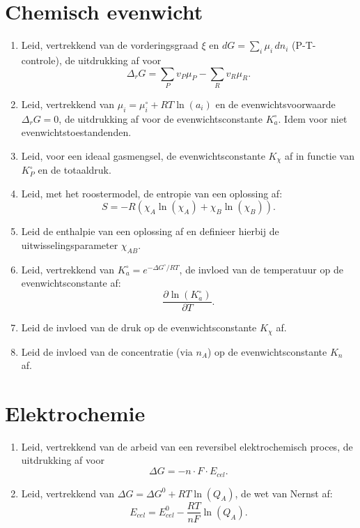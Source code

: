 \documentclass[11pt]{article}
\begin{document}
\section*{Chemisch evenwicht}

\begin{enumerate}[label=\textbf{\arabic*.}, leftmargin=1.5cm, resume]

\item Leid, vertrekkend van de vorderingsgraad $\xi$ en $dG = \sum_i \mu_i\,dn_i$ (P-T-controle), de uitdrukking af voor
\[
\Delta_r G = \sum_P v_P\mu_P - \sum_R v_R\mu_R.
\]

\item Leid, vertrekkend van $\mu_i = \mu_i^\circ + RT\ln(a_i)$ en de evenwichtsvoorwaarde $\Delta_r G = 0$,
de uitdrukking af voor de evenwichtsconstante $K_a^\circ$. Idem voor niet evenwichtstoestandenden.

\item Leid, voor een ideaal gasmengsel, de evenwichtsconstante $K_\chi$ af in functie van $K_P^\circ$ en de totaaldruk.

\item Leid, met het roostermodel, de entropie van een oplossing af:
\[
S = -R\left(\chi_A\ln(\chi_A) + \chi_B\ln(\chi_B)\right).
\]

\item Leid de enthalpie van een oplossing af en definieer hierbij de uitwisselingsparameter $\chi_{AB}$.

\item Leid, vertrekkend van $K_a^\circ = e^{-\Delta G^\circ/RT}$, de invloed van de temperatuur op de evenwichtsconstante af:
\[
\frac{\partial \ln(K_a^\circ)}{\partial T}.
\]

\item Leid de invloed van de druk op de evenwichtsconstante $K_\chi$ af.

\item Leid de invloed van de concentratie (via $n_A$) op de evenwichtsconstante $K_n$ af.



\end{enumerate}

\section*{Elektrochemie}

\begin{enumerate}[label=\textbf{\arabic*.}, leftmargin=1.5cm, resume]

\item Leid, vertrekkend van de arbeid van een reversibel elektrochemisch proces, de uitdrukking af voor
\[
\Delta G = -n\cdot F\cdot E_{cel}.
\]

\item Leid, vertrekkend van $\Delta G = \Delta G^0 + RT\ln(Q_A)$, de wet van Nernst af:
\[
E_{cel} = E_{cel}^0 - \frac{RT}{nF}\ln(Q_A).
\]

\end{enumerate}
\end{document}
